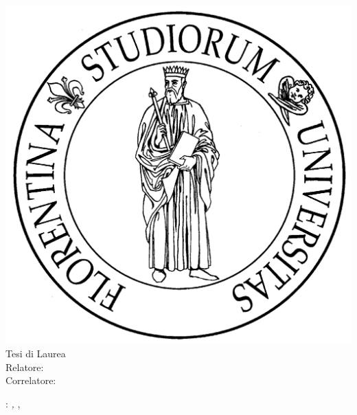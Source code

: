 \begin{titlepage}
	\begin{center}
   	\large
      \hfill
      \vfill
      \begingroup
			\spacedallcaps{\myUni} \\ 
			\myFaculty \\
			\myDegree \\ 
			\vspace{0.5cm}
         \includegraphics[scale=.065]{logo/unifi}\\
         \vspace{0.5cm}    
         Tesi di Laurea    
      \endgroup 
      \vfill 
      \begingroup
      	\color{Maroon}\spacedallcaps{\myTitle} \\ \bigskip
      \endgroup
      \spacedlowsmallcaps{\myName}
      \vfill  
      Relatore: {\itshape\myProf} \\
	  \vfill
	  Correlatore: {\itshape\myOtherProf}
      \vfill                   
      \myTime
      \vfill                      
	\end{center}        
\end{titlepage}   
   \newpage
	\thispagestyle{empty}
	\hfill
	\vfill
	\noindent\myName: 
	\textit{\myTitle,} 
	\myDegree, \textcopyright\ \myTime
